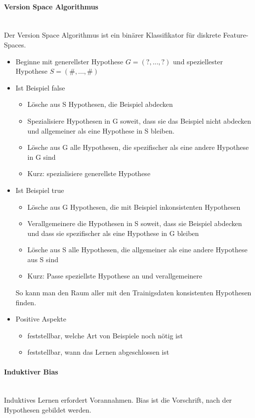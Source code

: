 \paragraph{Version Space Algorithmus} \mbox{} \\
Der Version Space Algorithmus ist ein binärer Klassifikator für diskrete
Feature-Spaces.
\begin{itemize}
    \item Beginne mit generellster Hypothese $G=(?,...,?)$ und speziellester
    Hypothese $S = (\#,...,\#)$
    \item Ist Beispiel false
    \begin{itemize}
        \item Lösche aus S Hypothesen, die Beispiel abdecken
        \item Spezialisiere Hypothesen in G soweit, dass sie das Beispiel nicht abdecken
        und allgemeiner als eine Hypothese in S bleiben.
        \item Lösche aus G alle Hypothesen, die spezifischer als eine andere
        Hypothese in G sind
        \item Kurz: spezialisiere generellste Hypothese
    \end{itemize}
    \item Ist Beispiel true
    \begin{itemize}
        \item Lösche aus G Hypothesen, die mit Beispiel inkonsistenten Hypothesen
        \item Verallgemeinere die Hypothesen in S soweit, dass sie Beispiel abdecken
        und dass sie spezifischer als eine Hypothese in G bleiben
        \item Lösche aus S alle Hypothesen, die allgemeiner als eine andere
        Hypothese aus S sind
        \item Kurz: Passe speziellste Hypothese an und verallgemeinere
    \end{itemize}
    So kann man den Raum aller mit den Trainigsdaten konsistenten Hypothesen
    finden.

    \item Positive Aspekte
    \begin{itemize}
        \item feststellbar, welche Art von Beispiele noch nötig ist
        \item feststellbar, wann das Lernen abgeschlossen ist
    \end{itemize}
\end{itemize}
\paragraph{Induktiver Bias} \mbox{} \\
Induktives Lernen erfordert Vorannahmen. Bias ist die Vorschrift, nach der Hypothesen
gebildet werden.
